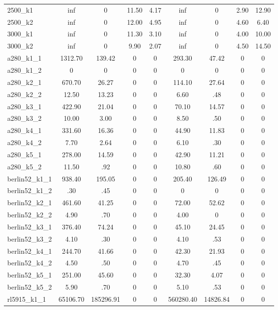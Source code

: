 \documentclass{article}
\begin{document}
\begin{center}
\begin{tabular}{|l|c|c|c|c|c|c|c|c|}
2500\_k1 & inf & 0 & 11.50 & 4.17 & inf & 0 & 2.90 & 12.90\\
2500\_k2 & inf & 0 & 12.00 & 4.95 & inf & 0 & 4.60 & 6.40\\
3000\_k1 & inf & 0 & 11.30 & 3.10 & inf & 0 & 4.00 & 10.00\\
3000\_k2 & inf & 0 & 9.90 & 2.07 & inf & 0 & 4.50 & 14.50\\
a280\_k1\_1 & 1312.70 & 139.42 & 0 & 0 & 293.30 & 47.42 & 0 & 0\\
a280\_k1\_2 & 0 & 0 & 0 & 0 & 0 & 0 & 0 & 0\\
a280\_k2\_1 & 670.70 & 26.27 & 0 & 0 & 114.10 & 27.64 & 0 & 0\\
a280\_k2\_2 & 12.50 & 13.23 & 0 & 0 & 6.60 & .48 & 0 & 0\\
a280\_k3\_1 & 422.90 & 21.04 & 0 & 0 & 70.10 & 14.57 & 0 & 0\\
a280\_k3\_2 & 10.00 & 3.00 & 0 & 0 & 8.50 & .50 & 0 & 0\\
a280\_k4\_1 & 331.60 & 16.36 & 0 & 0 & 44.90 & 11.83 & 0 & 0\\
a280\_k4\_2 & 7.70 & 2.64 & 0 & 0 & 6.10 & .30 & 0 & 0\\
a280\_k5\_1 & 278.00 & 14.59 & 0 & 0 & 42.90 & 11.21 & 0 & 0\\
a280\_k5\_2 & 11.50 & .92 & 0 & 0 & 10.80 & .60 & 0 & 0\\
berlin52\_k1\_1 & 938.40 & 195.05 & 0 & 0 & 205.40 & 126.49 & 0 & 0\\
berlin52\_k1\_2 & .30 & .45 & 0 & 0 & 0 & 0 & 0 & 0\\
berlin52\_k2\_1 & 461.60 & 41.25 & 0 & 0 & 72.00 & 52.62 & 0 & 0\\
berlin52\_k2\_2 & 4.90 & .70 & 0 & 0 & 4.00 & 0 & 0 & 0\\
berlin52\_k3\_1 & 376.40 & 74.24 & 0 & 0 & 45.10 & 24.45 & 0 & 0\\
berlin52\_k3\_2 & 4.10 & .30 & 0 & 0 & 4.10 & .53 & 0 & 0\\
berlin52\_k4\_1 & 244.70 & 41.66 & 0 & 0 & 42.30 & 21.93 & 0 & 0\\
berlin52\_k4\_2 & 4.50 & .50 & 0 & 0 & 4.70 & .45 & 0 & 0\\
berlin52\_k5\_1 & 251.00 & 45.60 & 0 & 0 & 32.30 & 4.07 & 0 & 0\\
berlin52\_k5\_2 & 5.90 & .70 & 0 & 0 & 5.10 & .53 & 0 & 0\\
rl5915\_k1\_1 & 65106.70 & 185296.91 & 0 & 0 & 560280.40 & 14826.84 & 0 & 0\\
\hline
\end{tabular}
\end{center}
\end{document}
